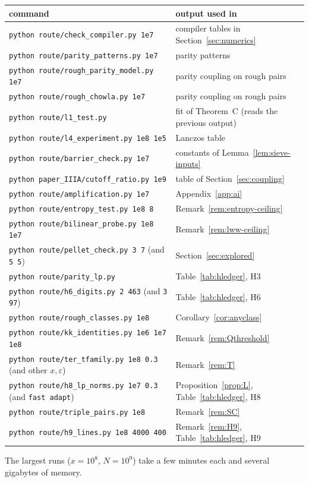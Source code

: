 \documentclass[11pt]{amsart}
\theoremstyle{definition}
\theoremstyle{remark}
\begin{document}
\begin{center}
\small
\begin{tabular}{ll}
\toprule
command & output used in\\
\midrule
\texttt{python route/check\_compiler.py 1e7} & compiler tables in Section~\ref{sec:numerics}\\
\texttt{python route/parity\_patterns.py 1e7} & parity patterns\\
\texttt{python route/rough\_parity\_model.py 1e7} & parity coupling on rough pairs\\
\texttt{python route/rough\_chowla.py 1e7} & parity coupling on rough pairs\\
\texttt{python route/l1\_test.py} & fit of Theorem~C (reads the previous output)\\
\texttt{python route/l4\_experiment.py 1e8 1e5} & Lanczos table\\
\texttt{python route/barrier\_check.py 1e7} & constants of Lemma~\ref{lem:sieve-inputs}\\
\texttt{python paper\_IIIA/cutoff\_ratio.py 1e9} & table of Section~\ref{sec:coupling}\\
\texttt{python route/amplification.py 1e7} & Appendix~\ref{app:ai}\\
\texttt{python route/entropy\_test.py 1e8 8} & Remark~\ref{rem:entropy-ceiling}\\
\texttt{python route/bilinear\_probe.py 1e8 1e7} & Remark~\ref{rem:lww-ceiling}\\
\texttt{python route/pellet\_check.py 3 7} (and \texttt{5 5}) & Section~\ref{sec:explored}\\
\texttt{python route/parity\_lp.py} & Table~\ref{tab:hledger}, H3\\
\texttt{python route/h6\_digits.py 2 463} (and \texttt{3 97}) & Table~\ref{tab:hledger}, H6\\
\texttt{python route/rough\_classes.py 1e8} & Corollary~\ref{cor:anyclass}\\
\texttt{python route/kk\_identities.py 1e6 1e7 1e8} & Remark~\ref{rem:Qthreshold}\\
\texttt{python route/ter\_tfamily.py 1e8 0.3} (and other $x,\varepsilon$) & Remark~\ref{rem:T}\\
\texttt{python route/h8\_lp\_norms.py 1e7 0.3} (and \texttt{fast adapt}) & Proposition~\ref{prop:L}, Table~\ref{tab:hledger}, H8\\
\texttt{python route/triple\_pairs.py 1e8} & Remark~\ref{rem:SC}\\
\texttt{python route/h9\_lines.py 1e8 4000 400} & Remark~\ref{rem:H9}, Table~\ref{tab:hledger}, H9\\
\bottomrule
\end{tabular}
\end{center}
The largest runs ($x=10^8$, $N=10^9$) take a few minutes each and several gigabytes of memory.





\end{document}
